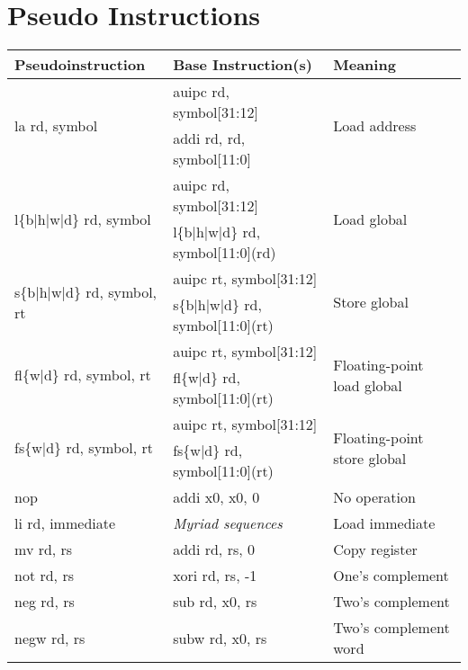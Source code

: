 \section*{Pseudo Instructions}
\small
\begin{tabular}{| l | l | l |}
Pseudoinstruction & Base Instruction(s) & Meaning \\ \hline

\multirow{2}{*}{\ttfamily la rd, symbol} & {\ttfamily auipc rd, symbol[31:12]} & \multirow{2}{*}{Load address} \\
                                   & {\ttfamily addi rd, rd, symbol[11:0]} & \\
\multirow{2}{*}{\ttfamily l\{b|h|w|d\} rd, symbol} & {\ttfamily auipc rd, symbol[31:12]} & \multirow{2}{*}{Load global} \\
                                           & {\ttfamily l\{b|h|w|d\} rd, symbol[11:0](rd)} & \\
\multirow{2}{*}{\ttfamily s\{b|h|w|d\} rd, symbol, rt} & {\ttfamily auipc rt, symbol[31:12]} & \multirow{2}{*}{Store global} \\
                                               & {\ttfamily s\{b|h|w|d\} rd, symbol[11:0](rt)} & \\
\multirow{2}{*}{\ttfamily fl\{w|d\} rd, symbol, rt} & {\ttfamily auipc rt, symbol[31:12]} & \multirow{2}{*}{Floating-point load global} \\
                                            & {\ttfamily fl\{w|d\} rd, symbol[11:0](rt)} & \\
\multirow{2}{*}{\ttfamily fs\{w|d\} rd, symbol, rt} & {\ttfamily auipc rt, symbol[31:12]} & \multirow{2}{*}{Floating-point store global} \\
                                            & {\ttfamily fs\{w|d\} rd, symbol[11:0](rt)}  & \\
\hline
{\ttfamily nop} & {\ttfamily addi x0, x0, 0} & No operation \\
{\ttfamily li rd, immediate} & {\em Myriad sequences} & Load immediate \\
{\ttfamily mv rd, rs} & {\ttfamily addi rd, rs, 0} & Copy register \\
{\ttfamily not rd, rs} & {\ttfamily xori rd, rs, -1} & One's complement \\
{\ttfamily neg rd, rs} & {\ttfamily sub rd, x0, rs} & Two's complement \\
{\ttfamily negw rd, rs} & {\ttfamily subw rd, x0, rs} & Two's complement word \\

\end{tabular}
